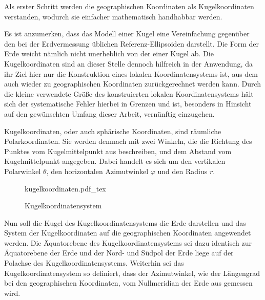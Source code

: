 Als erster Schritt werden die geographischen Koordinaten als Kugelkoordinaten verstanden, wodurch sie einfacher mathematisch handhabbar werden.\kleinerabstand

\noindent Es ist anzumerken, dass das Modell einer Kugel eine Vereinfachung gegenüber den bei der Erdvermessung üblichen Referenz-Ellipsoiden darstellt. Die Form der Erde weicht nämlich nicht unerheblich von der einer Kugel ab. Die Kugelkoordinaten sind an dieser Stelle dennoch hilfreich in der Anwendung, da ihr Ziel hier nur die Konstruktion eines lokalen Koordinatensystems ist, aus dem auch wieder zu geographischen Koordinaten zurückgerechnet werden kann. Durch die kleine verwendete Größe des konstruierten lokalen Koordinatensystems hält sich der systematische Fehler hierbei in Grenzen und ist, besonders in Hinsicht auf den gewünschten Umfang dieser Arbeit, vernünftig einzugehen.\kleinerabstand

Kugelkoordinaten, oder auch sphärische Koordinaten, sind räumliche Polarkoordinaten. Sie werden demnach mit zwei Winkeln, die die Richtung des Punktes vom Kugelmittelpunkt aus beschreiben, und dem Abstand vom Kugelmittelpunkt angegeben. Dabei handelt es sich um den vertikalen Polarwinkel $\theta$, den horizontalen Azimutwinkel $\varphi$ und den Radius $r$.\kleinerabstand

\begin{figure}[H]
	\centering
	\def\svgwidth{7cm}
	{kugelkoordinaten.pdf_tex}
	\caption{Kugelkoordinatensystem}
	\label{fig:kugelkoordinaten}
\end{figure}


Nun soll die Kugel des Kugelkoordinatensystems die Erde darstellen und das System der Kugelkoordinaten auf die geographischen Koordinaten angewendet werden. Die Äquatorebene des Kugelkoordinatensystems sei dazu identisch zur Äquatorebene der Erde und der Nord- und Südpol der Erde liege auf der Polachse des Kugelkoordinatensystems. Weiterhin sei das Kugelkoordinatensystem so definiert, dass der Azimutwinkel, wie der Längengrad bei den geographischen Koordinaten, vom Nullmeridian der Erde aus gemessen wird.\\

